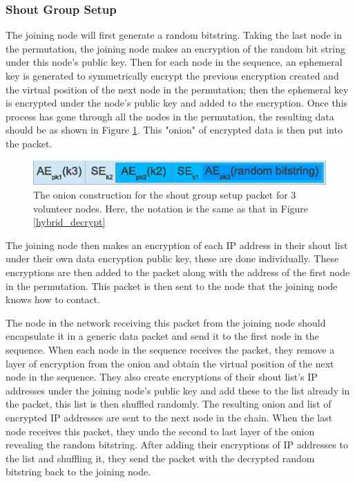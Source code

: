 \documentclass[ %
                    author={Luke Murray},
                supervisor={Dr. Simon Hollis},
                     title={Shadow Peer-to-Peer Networks},
                  subtitle={},
                    degree={MEng},
                      year={2013} ]{thesis}
\begin{document}
\subsubsection{Shout Group Setup}

The joining node will first generate a random bitstring. Taking the last node in the permutation, the joining node makes an encryption of the random bit string under this node's public key. Then for each node in the sequence, an ephemeral key is generated to symmetrically encrypt the previous encryption created and the virtual position of the next node in the permutation; then the ephemeral key is encrypted under the node's public key and added to the encryption. Once this process has gone through all the nodes in the permutation, the resulting data should be as shown in Figure \ref{setup_enc}. This "onion" of encrypted data is then put into the packet.

\begin{figure}[h]
    \centering
    \includegraphics{diagrams/shout_group_onion.eps}
    \caption{The onion construction for the shout group setup packet for 3 volunteer nodes. Here, the notation is the same as that in Figure \ref{hybrid_decrypt}}
    \label{setup_enc}
\end{figure}

The joining node then makes an encryption of each IP address in their shout list under their own data encryption public key, these are done individually. These encryptions are then added to the packet along with the address of the first node in the permutation. This packet is then sent to the node that the joining node knows how to contact.

The node in the network receiving this packet from the joining node should encapsulate it in a generic data packet and send it to the first node in the sequence. When each node in the sequence receives the packet, they remove a layer of encryption from the onion and obtain the virtual position of the next node in the sequence. They also create encryptions of their shout list's IP addresses under the joining node's public key and add these to the list already in the packet, this list is then shuffled randomly. The resulting onion and list of encrypted IP addresses are sent to the next node in the chain. When the last node receives this packet, they undo the second to last layer of the onion revealing the random bitstring. After adding their encryptions of IP addresses to the list and shuffling it, they send the packet with the decrypted random bitstring back to the joining node.
\end{document}
